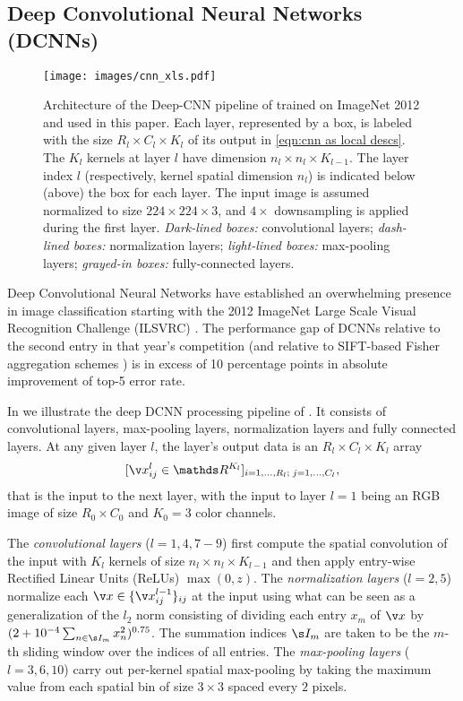 \documentclass{article}
\begin{document}
\subsection{Deep Convolutional Neural Networks (DCNNs)}
\begin{figure} 
\texttt{[image: images/cnn\_xls.pdf]}
\caption{Architecture of the Deep-CNN pipeline of \cite{Krizhevsky2012} trained on ImageNet 2012 and used in this paper. Each layer, represented by a box, is labeled with the size $R_l \times C_l \times K_l$ of its output in \eqref{eqn:cnn as local descs}. The $K_l$ kernels at layer $l$ have dimension $n_l \times n_l \times K_{l-1}$. The layer index $l$ (respectively, kernel spatial dimension $n_l$) is indicated below (above) the box for each layer. The input image is assumed normalized to size $224 \times 224 \times 3$, and $4\times$ downsampling is applied during the first layer. \emph{Dark-lined boxes:} convolutional layers; \emph{dash-lined boxes:} normalization layers; \emph{light-lined boxes:} max-pooling layers; \emph{grayed-in boxes:} fully-connected layers.}
\label{fig:DCNN}
\end{figure}
Deep Convolutional Neural Networks have established an overwhelming presence in image classification starting with the 2012 ImageNet Large Scale Visual Recognition Challenge (ILSVRC) \cite{Krizhevsky2012}. The performance gap of DCNNs relative to the second entry in that year's competition (and relative to SIFT-based Fisher aggregation schemes \cite{Sanchez2011}) is in excess of 10 percentage points in absolute improvement of top-5 error rate. 

In  we illustrate the deep DCNN processing pipeline of \cite{Krizhevsky2012}. It consists of convolutional layers, max-pooling layers, normalization layers and fully connected layers. At any given layer $l$, the layer's output data is an $R_l \times C_l \times K_l$ array 
\begin{equation} \label{eqn:cnn as local descs}
[ \v x^l_{ij} \in \mathds R^{K_l} ]_{i=1,\ldots,R_l;\; j=1,\ldots,C_l},
\end{equation}
that is the input to the next layer, with the input to layer $l=1$ being an RGB image of size $R_0 \times C_0$ and $K_0=3$ color channels. 

The  \emph{convolutional layers} ($l=1,4,7-9$) first compute the spatial convolution of the input with $K_{l}$ kernels of size $n_l \times n_l \times K_{l-1} $ and then apply entry-wise Rectified Linear Units (ReLUs)  $\max(0,z)$. 
The \emph{normalization layers} ($l=2,5$) normalize each $\v x \in \{\v x^{l-1}_{ij}\}_{ij}$ at the input using what can be seen as a generalization of the $l_2$ norm consisting of dividing each entry $x_m$ of $\v x$ by $ (2 + 10^{-4} \sum_{n \in \s I_m} x_n^2)^{0.75}$. The summation indices $\s I_m$ are taken to be the $m$-th sliding window over the indices of all entries.
The \emph{max-pooling layers} ($l=3,6,10$) carry out per-kernel spatial max-pooling by taking the maximum value from each spatial bin of size $3 \times 3$ spaced every $2$ pixels.
\end{document}

